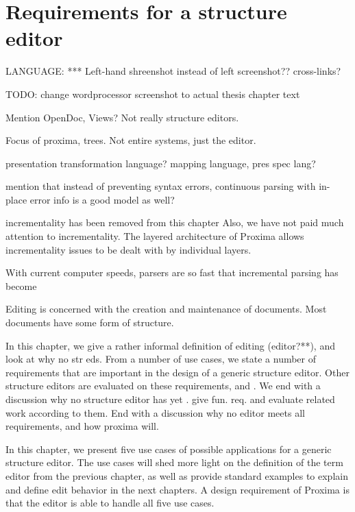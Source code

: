 \chapter{Requirements for a structure editor} %
\label{chap:requirements}




\bc

LANGUAGE:
*** Left-hand shreenshot instead of left screenshot??
cross-links?

TODO: change wordprocessor screenshot to actual thesis chapter text


Mention OpenDoc, Views? Not really structure editors.

Focus of proxima, trees. Not entire systems, just the editor.

presentation transformation language? mapping language, pres spec lang?

mention that instead of preventing syntax errors, continuous parsing with in-place error 
info is a good model as well?

incrementality  has been removed from this chapter
Also, we have not paid much attention to incrementality. The layered architecture of Proxima allows incrementality issues to be dealt with by individual layers. 

With current computer speeds, parsers are so fast that incremental parsing has become %
\ec

\bc
Editing is concerned with the creation and maintenance of documents.  
Most documents have some form of structure. 

In this chapter, we give a rather informal definition of editing (editor?**), and look at why no str eds. From a number of use cases, we state a number of requirements that are important in the design of a generic structure editor. Other structure editors are evaluated on these requirements, and . We end with a discussion why no structure editor has yet .  give fun. req. and evaluate related work according to them. End with a discussion why no editor meets all requirements, and how proxima will.
\ec

In this chapter, we present five use cases of possible applications for a generic structure editor. The use cases will shed more light on the definition of the term editor from the previous chapter, as well as provide standard examples to explain and define edit behavior in the next chapters. A design requirement of Proxima is that the editor is able to handle all five use cases. 

